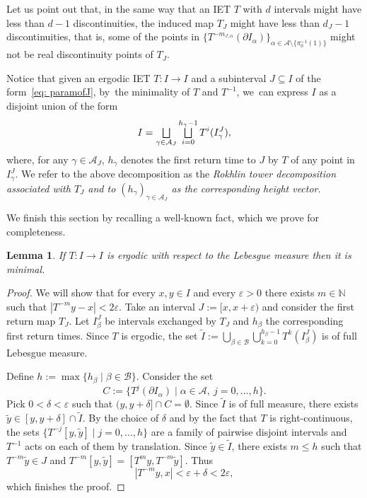 \documentclass[JEP,XML,SOM,Unicode,NoEqCountersInSection,NoFloatCountersInSection,published]{cedram}
\let\oldbigsqcup\bigsqcup
\renewcommand{\bigsqcup}{\mathop{\textstyle\oldbigsqcup}\displaylimits}
\let\epsilon\varepsilon
\theoremstyle{plain}
\newtheorem{lemma}[theorem]{Lemma}
\theoremstyle{definition}
\newcommand{\A}{\mathcal{A}}
\newcommand{\N}{\mathbb{N}}
\begin{document}
{Let us point out that, in the same way that an IET $T$ with $d$ intervals might have less than $d - 1$ discontinuities, the induced map $T_J$ might have less than $d_J - 1$ discontinuities, that is, some of the points in $
\{T^{-m_{J,\alpha}}(\partial I_{\alpha})\}_{\alpha\in \A\setminus \{\pi_0^{-1}(1)\}}$ might not be real discontinuity points of $T_J$.

Notice that given an ergodic IET $T: I \to I$ and a subinterval $J \subseteq I$ of the form~\eqref{eq: paramofJ}, by~the minimality of $T$ and $T^{-1}$, we~can express $I$ as a disjoint union of the form
\begin{equation}
\label{eq:towers_decomposition}
I = \bigsqcup_{\gamma \in \A_J} \bigsqcup_{i = 0}^{h_\gamma - 1} T^i(I_\gamma^J),
\end{equation}
where, for any $\gamma \in \A_J$, $h_\gamma$ denotes the first return time to $J$ by $T$ of any point in $I_\gamma^J$. We refer to the above decomposition as the \emph{Rokhlin tower decomposition associated with $T_J$ and to $(h_{\gamma})_{\gamma\in \A_J}$ as the corresponding \emph{height} vector}.

We finish this section by recalling a well-known fact, which we prove for completeness.

\begin{lemma}\label{lem: minimality}
If $T: I \to I$ is ergodic with respect to the Lebesgue measure then it is minimal.
\end{lemma}

\begin{proof}
We will show that for every $x,y\in I$ and every $\epsilon>0$ there exists $m\in\N$ such that $|T^{-m}y-x|<2\epsilon$. Take an interval $J:=[x,x+\epsilon)$ and consider the first return map $T_J$. Let $I^J_{\beta}$ be intervals exchanged by $T_J$ and $h_{\beta}$ the corresponding first return times. Since $T$ is ergodic, the set $\tilde I:=\bigcup_{\beta\in \mathcal B}\bigcup_{k=0}^{h_{\beta}-1} T^k(I^J_{\beta})$ is of full Lebesgue measure.

Define $h:=\max\{h_{\beta}\mid\beta\in\mathcal B\}$. Consider the set
\[
C:=\{T^{j}(\partial I_{\alpha})\mid \alpha\in\A,\ j=0,\ldots,h\}.
\]
Pick $0<\delta<\epsilon$ such that $(y,y+\delta]\cap C=\emptyset$. Since $\tilde I$ is of full measure, there exists $\tilde y\in[y,y+\delta]\cap \tilde I$. By the choice of $\delta$ and by the fact that $T$ is right-continuous, the sets $\{T^{-j}[y,\tilde y]\mid j=0,\ldots,h\}$ are a family of pairwise disjoint intervals and $T^{-1}$ acts on each of them by translation. Since $\tilde y\in\tilde I$, there exists $m\le h$ such that $T^{-m}\tilde y\in J$ and $T^{-m}[y,\tilde y]=[T^{m}y,T^{-m}\tilde y]$. Thus
\[
|T^{-m}y,x|<\epsilon+\delta<2\epsilon,
\]
which finishes the proof.
\end{proof}
}
\end{document}
